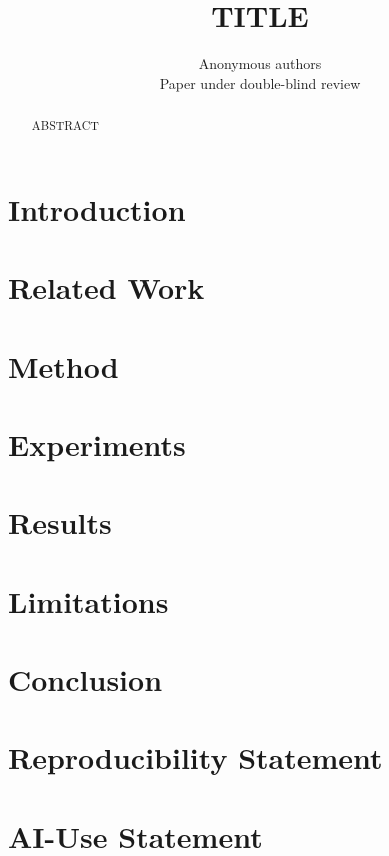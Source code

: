 \documentclass[10pt]{article}
\title{TITLE}
\author{Anonymous authors\\Paper under double-blind review}
\date{}
\begin{document}
\maketitle

\begin{abstract}
ABSTRACT
\end{abstract}

\section{Introduction}
\section{Related Work}
\section{Method}
\section{Experiments}
\section{Results}
\section{Limitations}
\section{Conclusion}

\section*{Reproducibility Statement}

\section*{AI-Use Statement}



\end{document}
